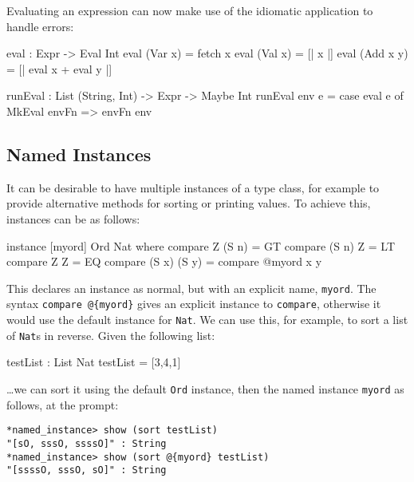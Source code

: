 \noindent
Evaluating an expression can now make use of the idiomatic application to handle errors:

\begin{code}
eval : Expr -> Eval Int
eval (Var x)   = fetch x
eval (Val x)   = [| x |]
eval (Add x y) = [| eval x + eval y |]
  
runEval : List (String, Int) -> Expr -> Maybe Int
runEval env e = case eval e of
    MkEval envFn => envFn env
\end{code} 

\subsection{Named Instances}

It can be desirable to have multiple instances of a type class, for example to provide alternative methods for sorting or printing values.
To achieve this, instances can be  as follows:

\begin{code}
instance [myord] Ord Nat where
   compare Z (S n)     = GT
   compare (S n) Z     = LT
   compare Z Z         = EQ
   compare (S x) (S y) = compare @{myord} x y
\end{code}

\noindent
This declares an instance as normal, but with an explicit name, \texttt{myord}.
The syntax \texttt{compare @\{myord\}} gives an explicit instance to \texttt{compare}, otherwise it would use the default instance for \texttt{Nat}.
We can use this, for example, to sort a list of \texttt{Nat}s in reverse.
Given the following list:

\begin{code}
testList : List Nat
testList = [3,4,1]
\end{code}

\noindent
\ldots we can sort it using the default \texttt{Ord} instance, then the named instance \texttt{myord} as follows, at the \Idris{} prompt:

\begin{lstlisting}
*named_instance> show (sort testList)
"[sO, sssO, ssssO]" : String
*named_instance> show (sort @{myord} testList)
"[ssssO, sssO, sO]" : String
\end{lstlisting}

